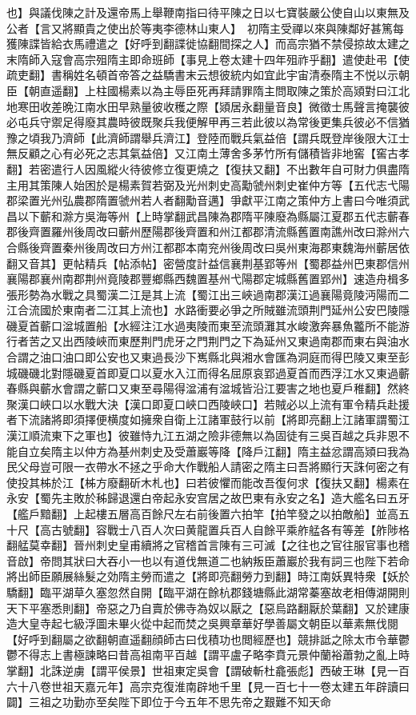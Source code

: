 也】與議伐陳之計及還帝馬上舉鞭南指曰待平陳之日以七寶裝嚴公使自山以東無及公者【言又將顯貴之使出於等夷李德林山東人】　初隋主受禪以來與陳鄰好甚篤每獲陳諜皆給衣馬禮遣之【好呼到翻諜徙協翻間探之人】而高宗猶不禁侵掠故太建之末隋師入寇會高宗殂隋主即命班師【事見上卷太建十四年殂祚乎翻】遣使赴弔【使疏吏翻】書稱姓名頓首帝答之益驕書末云想彼統内如宜此宇宙清泰隋主不悦以示朝臣【朝直遥翻】上柱國楊素以為主辱臣死再拜請罪隋主問取陳之策於高熲對曰江北地寒田收差晩江南水田早熟量彼收穫之際【熲居永翻量音良】微徵士馬聲言掩襲彼必屯兵守禦足得廢其農時彼既聚兵我便解甲再三若此彼以為常後更集兵彼必不信猶豫之頃我乃濟師【此濟師謂舉兵濟江】登陸而戰兵氣益倍【謂兵既登岸後限大江士無反顧之心有必死之志其氣益倍】又江南土薄舍多茅竹所有儲積皆非地窖【窖古孝翻】若密遣行人因風縱火待彼修立復更燒之【復扶又翻】不出數年自可財力俱盡隋主用其策陳人始困於是楊素賀若弼及光州刺史高勱虢州刺史崔仲方等【五代志弋陽郡梁置光州弘農郡隋置虢州若人者翻勱音邁】爭獻平江南之策仲方上書曰今唯須武昌以下蘄和滁方吳海等州【上時掌翻武昌陳為郡隋平陳廢為縣屬江夏郡五代志蘄春郡後齊置羅州後周改曰蘄州歷陽郡後齊置和州江都郡清流縣舊置南譙州改曰滁州六合縣後齊置秦州後周改曰方州江都郡本南兖州後周改曰吳州東海郡東魏海州蘄居依翻又音其】更帖精兵【帖添帖】密營度計益信襄荆基郢等州【蜀郡益州巴東郡信州襄陽郡襄州南郡荆州竟陵郡豐鄉縣西魏置基州弋陽郡定城縣舊置郢州】速造舟楫多張形勢為水戰之具蜀漢二江是其上流【蜀江出三峽過南郡漢江過襄陽竟陵沔陽而二江合流國於東南者二江其上流也】水路衝要必爭之所賊雖流頭荆門延州公安巴陵隱磯夏首蘄口湓城置船【水經注江水過夷陵而東至流頭灘其水峻激奔暴魚龞所不能游行者苦之又出西陵峽而東歷荆門虎牙之門荆門之下為延州又東過南郡而東右與油水合謂之油口油口即公安也又東過長沙下嶲縣北與湘水會匯為洞庭而得巴陵又東至彭城磯磯北對隱磯夏首即夏口以夏水入江而得名屈原哀郢過夏首而西浮江水又東過蘄春縣與蘄水會謂之蘄口又東至尋陽得湓浦有湓城皆沿江要害之地也夏戶稚翻】然終聚漢口峽口以水戰大決【漢口即夏口峽口西陵峽口】若賊必以上流有軍令精兵赴援者下流諸將即須擇便横度如擁衆自衛上江諸軍鼓行以前【將即亮翻上江諸軍謂蜀江漢江順流東下之軍也】彼雖恃九江五湖之險非德無以為固徒有三吳百越之兵非恩不能自立矣隋主以仲方為基州刺史及受蕭巖等降【降戶江翻】隋主益忿謂高熲曰我為民父母豈可限一衣帶水不拯之乎命大作戰船人請密之隋主曰吾將顯行天誅何密之有使投其柹於江【柹方廢翻斫木札也】曰若彼懼而能改吾復何求【復扶又翻】楊素在永安【蜀先主敗於秭歸退還白帝起永安宫居之故巴東有永安之名】造大艦名曰五牙【艦戶黯翻】上起樓五層高百餘尺左右前後置六拍竿【拍竿發之以拍敵船】並高五十尺【高古號翻】容戰士八百人次曰黄龍置兵百人自餘平乘舴艋各有等差【舴陟格翻艋莫幸翻】晉州刺史皇甫續將之官稽首言陳有三可滅【之往也之官往服官事也稽音啟】帝問其狀曰大吞小一也以有道伐無道二也納叛臣蕭巖於我有詞三也陛下若命將出師臣願展絲髮之効隋主勞而遣之【將即亮翻勞力到翻】時江南妖異特衆【妖於驕翻】臨平湖草久塞忽然自開【臨平湖在餘杭郡錢塘縣此湖常蓁塞故老相傳湖開則天下平塞悉則翻】帝惡之乃自賣於佛寺為奴以厭之【惡烏路翻厭於葉翻】又於建康造大皇寺起七級浮圖未畢火從中起而焚之吳興章華好學善屬文朝臣以華素無伐閱【好呼到翻屬之欲翻朝直遥翻顔師古曰伐積功也閲經歷也】競排詆之除太市令華鬱鬱不得志上書極諫略曰昔高祖南平百越【謂平盧子略李賁元景仲蘭裕蕭勃之亂上時掌翻】北誅逆虜【謂平侯景】世祖東定吳會【謂破斬杜龕張彪】西破王琳【見一百六十八卷世祖天嘉元年】高宗克復淮南辟地千里【見一百七十一卷太建五年辟讀曰闢】三祖之功勤亦至矣陛下即位于今五年不思先帝之艱難不知天命